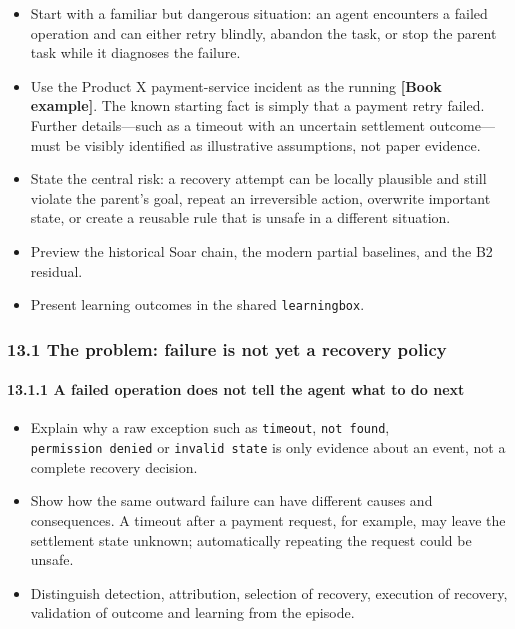 \begin{itemize}
\tightlist
\item
  Start with a familiar but dangerous situation: an agent encounters a failed operation and can either retry blindly, abandon the task, or stop the parent task while it diagnoses the failure.
\item
  Use the Product X payment-service incident as the running \textbf{{[}Book example{]}}. The known starting fact is simply that a payment retry failed. Further details---such as a timeout with an uncertain settlement outcome---must be visibly identified as illustrative assumptions, not paper evidence.
\item
  State the central risk: a recovery attempt can be locally plausible and still violate the parent's goal, repeat an irreversible action, overwrite important state, or create a reusable rule that is unsafe in a different situation.
\item
  Preview the historical Soar chain, the modern partial baselines, and the B2 residual.
\item
  Present learning outcomes in the shared \texttt{learningbox}.
\end{itemize}

\subsubsection{13.1 The problem: failure is not yet a recovery policy}\label{the-problem-failure-is-not-yet-a-recovery-policy}

\paragraph{13.1.1 A failed operation does not tell the agent what to do next}\label{a-failed-operation-does-not-tell-the-agent-what-to-do-next}

\begin{itemize}
\tightlist
\item
  Explain why a raw exception such as \texttt{timeout}, \texttt{not\ found}, \texttt{permission\ denied} or \texttt{invalid\ state} is only evidence about an event, not a complete recovery decision.
\item
  Show how the same outward failure can have different causes and consequences. A timeout after a payment request, for example, may leave the settlement state unknown; automatically repeating the request could be unsafe.
\item
  Distinguish detection, attribution, selection of recovery, execution of recovery, validation of outcome and learning from the episode.
\end{itemize}

